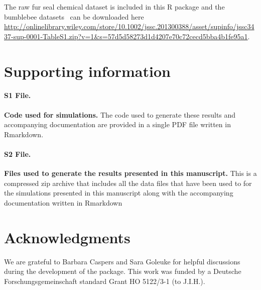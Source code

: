 \documentclass[10pt,letterpaper]{article}
\begin{document}
The raw fur seal chemical dataset is included in this R package and the bumblebee datasets~\cite{Dellicour.2013} can be downloaded here \url{http://onlinelibrary.wiley.com/store/10.1002/jssc.201300388/asset/supinfo/jssc3437-sup-0001-TableS1.zip?v=1&s=57d5d58273d1d4207e70c72cecd5bba4b1fe95a1}.

\section*{Supporting information}

\paragraph*{S1 File.}
\label{S1_Rmarkdow}
{\bf Code used for simulations.} The code used to generate these results and accompanying documentation are provided in a single PDF file written in Rmarkdown.

\paragraph*{S2 File.}
\label{S2_Data}
{\bf Files used to generate the results presented in this manuscript.} This is a compressed zip archive that includes all the data files that have been used to for the simulations presented in this manuscript along with the accompanying documentation written in Rmarkdown 

\section*{Acknowledgments}
We are grateful to Barbara Caspers and Sara Goleuke for helpful discussions during the development of the package. This work was funded by a Deutsche Forschungsgemeinschaft standard Grant HO 5122/3-1 (to J.I.H.).

\nolinenumbers
\end{document}
